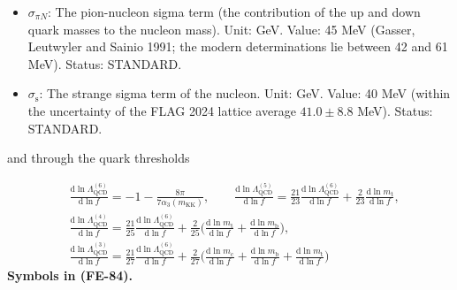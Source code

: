 \documentclass[
  10pt,
]{article}
\begin{document}
\begin{itemize}
  block is \(f^2\) times a four-dimensional space of constant curvature
  \(-H^2\)). Unit: dimensionless. Status: DERIVED.
\item
  \(\sigma_{\pi N}\): The pion-nucleon sigma term (the contribution of
  the up and down quark masses to the nucleon mass). Unit: GeV. Value:
  45 MeV (Gasser, Leutwyler and Sainio 1991; the modern determinations
  lie between 42 and 61 MeV). Status: STANDARD.
\item
  \(\sigma_{\mathrm{s}}\): The strange sigma term of the nucleon. Unit:
  GeV. Value: 40 MeV (within the uncertainty of the FLAG 2024 lattice
  average \(41.0 \pm 8.8\) MeV). Status: STANDARD.
\end{itemize}

and through the quark thresholds

\[
\begin{aligned}
&\frac{\mathrm{d}\ln\Lambda_{\mathrm{QCD}}^{(6)}}{\mathrm{d}\ln f} = -1 -
 \frac{8\pi}{7\alpha_3(m_{\mathrm{KK}})},\qquad
 \frac{\mathrm{d}\ln\Lambda_{\mathrm{QCD}}^{(5)}}{\mathrm{d}\ln f} =
 \frac{21}{23}\frac{\mathrm{d}\ln\Lambda_{\mathrm{QCD}}^{(6)}}{\mathrm{d}\ln f}
 + \frac{2}{23}\frac{\mathrm{d}\ln m_{\mathrm{t}}}{\mathrm{d}\ln f},\\
&\frac{\mathrm{d}\ln\Lambda_{\mathrm{QCD}}^{(4)}}{\mathrm{d}\ln f} =
 \frac{21}{25}\frac{\mathrm{d}\ln\Lambda_{\mathrm{QCD}}^{(6)}}{\mathrm{d}\ln f}
 + \frac{2}{25}\Big(\frac{\mathrm{d}\ln m_{\mathrm{t}}}{\mathrm{d}\ln f} + \frac{\mathrm{d}\ln
 m_{\mathrm{b}}}{\mathrm{d}\ln f}\Big),\\
&\frac{\mathrm{d}\ln\Lambda_{\mathrm{QCD}}^{(3)}}{\mathrm{d}\ln f} =
 \frac{21}{27}\frac{\mathrm{d}\ln\Lambda_{\mathrm{QCD}}^{(6)}}{\mathrm{d}\ln f}
 + \frac{2}{27}\Big(\frac{\mathrm{d}\ln m_{\mathrm{c}}}{\mathrm{d}\ln f} + \frac{\mathrm{d}\ln
 m_{\mathrm{b}}}{\mathrm{d}\ln f}
 + \frac{\mathrm{d}\ln m_{\mathrm{t}}}{\mathrm{d}\ln f}\Big)
\end{aligned} \tag{FE-84}
\] \textbf{Symbols in (FE-84).}
\end{document}
